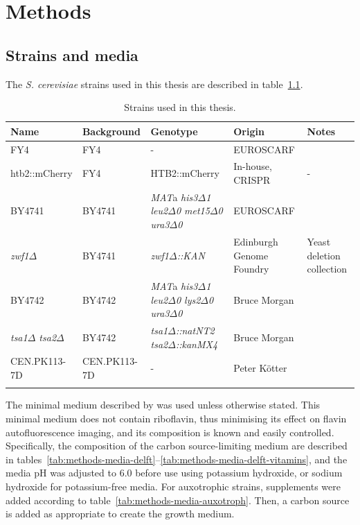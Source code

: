 \chapter{Methods}
\label{ch:methods}

\section{Strains and media}
\label{sec:methods-strains_media}

The \textit{S. cerevisiae} strains used in this thesis are described in table~\ref{tab:methods-strains}.

\begin{table}
  \footnotesize
  \centering
  \begin{tabularx}{\linewidth}{bbbbb}
    \toprule
    Name & Background & Genotype & Origin & Notes\\
    \midrule
    FY4 & FY4 & - & EUROSCARF & \textcite{winstonConstructionSetConvenient1995} \\
    htb2::mCherry & FY4 & HTB2::mCherry & In-house, CRISPR & - \\
    BY4741 & BY4741 & \textit{MAT}a \textit{his3$\Delta$1 leu2$\Delta$0 met15$\Delta$0 ura3$\Delta$0} & EUROSCARF & \textcite{brachmannDesignerDeletionStrains1998}\\
    \textit{zwf1$\Delta$} & BY4741 & \textit{zwf1$\Delta$::KAN} & Edinburgh Genome Foundry & Yeast deletion collection \\
    BY4742 & BY4742 & \textit{MAT}a \textit{his3$\Delta$1 leu2$\Delta$0 lys2$\Delta$0 ura3$\Delta$0} & Bruce Morgan & \textcite{calabreseHyperoxidationMitochondrialPeroxiredoxin2019}\\
    \textit{tsa1$\Delta$ tsa2$\Delta$} & BY4742 & \textit{tsa1$\Delta$::natNT2 tsa2$\Delta$::kanMX4} & Bruce Morgan & \textcite{calabreseHyperoxidationMitochondrialPeroxiredoxin2019} \\
    CEN.PK113-7D & CEN.PK113-7D & - & Peter K\"{o}tter & \textcite{nijkampNovoSequencingAssembly2012} \\
    \bottomrule \\
  \end{tabularx}
  \caption{Strains used in this thesis.}
  \label{tab:methods-strains}
\end{table}

The minimal medium described by \parencite{verduynEffectBenzoicAcid1992} was used unless otherwise stated.
This minimal medium does not contain riboflavin, thus minimising its effect on flavin autofluorescence imaging, and its composition is known and easily controlled.
Specifically, the composition of the carbon source-limiting medium are described in tables~\ref{tab:methods-media-delft}--\ref{tab:methods-media-delft-vitamins}, and the media pH was adjusted to 6.0 before use using potassium hydroxide, or sodium hydroxide for potassium-free media.
For auxotrophic strains, supplements were added according to table~\ref{tab:methods-media-auxotroph}.
Then, a carbon source is added as appropriate to create the growth medium.

